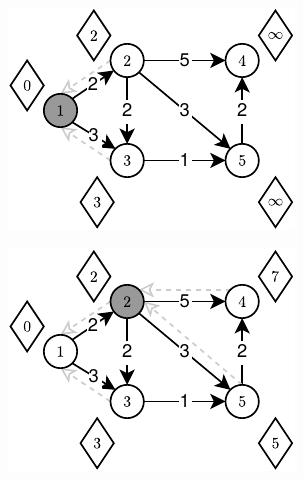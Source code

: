 \begin{figure}[!htbp]
	\centering
	\begin{subfigure}[b]{0.18\textwidth}
		\includegraphics[width=\textwidth]{Chapter_II/TOPOLOGIC-SHORTEST-PATH-Example/a.pdf}
		\caption{}
	\end{subfigure}
	\begin{subfigure}[b]{0.18\textwidth}
		\includegraphics[width=\textwidth]{Chapter_II/TOPOLOGIC-SHORTEST-PATH-Example/b.pdf}
		\caption{}
	\end{subfigure}
	\begin{subfigure}[b]{0.18\textwidth}

\end{subfigure}
\end{figure}
